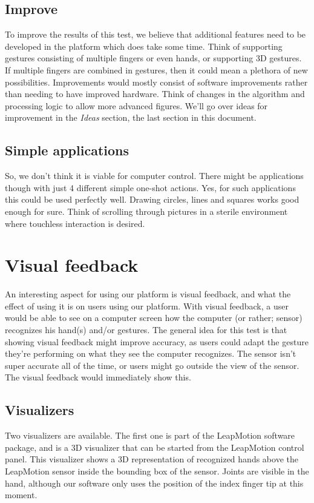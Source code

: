 \documentclass[a4paper]{article}
\begin{document}
  \subsection{Improve}
  To improve the results of this test, we believe that additional features need
  to be developed in the platform which does take some time. Think of supporting
  gestures consisting of multiple fingers or even hands, or supporting 3D
  gestures. If multiple fingers are combined in gestures, then it could mean a
  plethora of new possibilities. Improvements would mostly consist of software
  improvements rather than needing to have improved hardware. Think of changes
  in the algorithm and processing logic to allow more advanced figures. We'll go
  over ideas for improvement in the \emph{Ideas} section, the last section in
  this document.

  \subsection{Simple applications}
  So, we don't think it is viable for computer control. There might be
  applications though with just 4 different simple one-shot actions.
  Yes, for such applications this could be used perfectly well. Drawing circles,
  lines and squares works good enough for sure. Think of scrolling through
  pictures in a sterile environment where touchless interaction is desired.

  \clearpage

  \section{Visual feedback}
  An interesting aspect for using our platform is visual feedback, and what the
  effect of using it is on users using our platform. With visual feedback, a
  user would be able to see on a computer screen how the computer (or rather;
  sensor) recognizes his hand(s) and/or gestures. The general idea for this test
  is that showing visual feedback might improve accuracy, as users could adapt
  the gesture they're performing on what they see the computer recognizes.
  The sensor isn't super accurate all of the time, or users might go outside the
  view of the sensor. The visual feedback would immediately show this.

  \subsection{Visualizers}
  Two visualizers are available. The first one is part of the LeapMotion
  software package, and is a 3D visualizer that can be started from the
  LeapMotion control panel. This visualizer shows a 3D representation of
  recognized hands above the LeapMotion sensor inside the bounding box of the
  sensor. Joints are visible in the hand, although our software only uses the
  position of the index finger tip at this moment.
\end{document}
